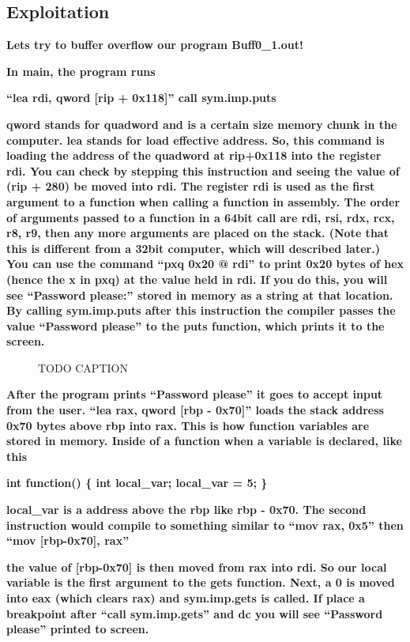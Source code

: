 \documentclass[letterpaper]{article}
\newcommand{\sitfig}[3]{
\begin{figure}[H]
\centering
\makebox[\textwidth][c]{
#2
}
\caption{#3}
\label{#1}
\end{figure}
}
\newcommand{\sitgfx}[4][scale=1.0]{
\sitfig{#3}{\texttt{[image: \#2]}}{#4}
}
\begin{document}
\subsection{Exploitation}

\textbf{Lets try to buffer overflow our program Buff0\_1.out!}

\textbf{In main, the program runs}

\textbf{{}``lea rdi, qword [rip + 0x118]''\newline
call sym.imp.puts}

\textbf{qword stands for quadword and is a certain size memory chunk in the computer. lea stands for load effective
address. So, this command is loading the address of the quadword at rip+0x118 into the register rdi. You can check by
stepping this instruction and seeing the value of (rip + 280) be moved into rdi. The register rdi is used as the first
argument to a function when calling a function in assembly. The order of arguments passed to a function in a 64bit call
are rdi, rsi, rdx, rcx, r8, r9, then any more arguments are placed on the stack. (Note that this is different from a
32bit computer, which will described later.) You can use the command ``pxq 0x20 @ rdi'' to print 0x20 bytes of hex
(hence the x in pxq) at the value held in rdi. If you do this, you will see ``Password please:'' stored in memory as a
string at that location. By calling sym.imp.puts after this instruction the compiler passes the value ``Password
please'' to the puts function, which prints it to the screen.}

  
\sitgfx[width=5.8335in,height=3.6457in]{FINALWORKINGDOCFORMERLYPRECURSOR-img090.png}{fig:unk}{TODO CAPTION}
 

\textbf{After the program prints ``Password please'' it goes to accept input from the user. ``lea rax, qword [rbp -
0x70]'' loads the stack address 0x70 bytes above rbp into rax. This is how function variables are stored in memory.
Inside of a function when a variable is declared, like this}

\textbf{int function() \{ int local\_var; local\_var = 5; \}}

\textbf{local\_var is a address above the rbp like rbp - 0x70. The second instruction would compile to something similar
to ``mov rax, 0x5'' then ``mov [rbp-0x70], rax''}

\textbf{the value of [rbp-0x70] is then moved from rax into rdi. So our local variable is the first argument to the gets
function. Next, a 0 is moved into eax (which clears rax) and sym.imp.gets is called. If place a breakpoint after ``call
sym.imp.gets'' and dc you will see ``Password please'' printed to screen.}
\end{document}
